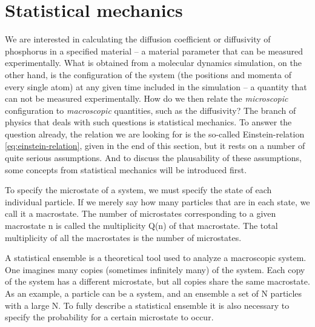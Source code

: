 \documentclass[11pt,bibliography=totoc,index=totoc]{scrbook}   %
\begin{document}


%
\section{Statistical mechanics}\label{sec:statistical-mechanics}
%

We are interested in calculating the diffusion coefficient or diffusivity of phosphorus in a specified material -- 
a material parameter that can be measured experimentally.
What is obtained from a molecular dynamics simulation, on the other hand, is the configuration of the system (the positions and momenta of every single atom) at any given time included in the simulation -- a quantity that can not be measured experimentally. 
How do we then relate the \emph{microscopic} configuration to \emph{macroscopic} quantities, such as the diffusivity?
The branch of physics that deals with such questions is statistical mechanics. 
To answer the question already, the relation we are looking for is the so-called Einstein-relation \eqref{eq:einstein-relation}, given in the end of this section, but it rests on a number of quite serious assumptions. 
And to discuss the plausability of these assumptions, some concepts from statistical mechanics will be introduced first.

To specify the microstate of a system, we must specify the state of each individual particle. If we merely say how many particles that are in each state, we call it a macrostate. The number of microstates corresponding to a given macrostate n is called the multiplicity Q(n) of that macrostate. The total multiplicity of all the macrostates is the number of microstates.



A statistical ensemble is a theoretical tool used to analyze a macroscopic system. One imagines many copies (sometimes infinitely many) of the system. Each copy of the system has a different microstate, but all copies share the same macrostate. As an example, a particle can be a system, and an ensemble a set of N particles with a large N.
To fully describe a statistical ensemble it is also necessary to specify the probability for a certain microstate to occur.
\end{document}
